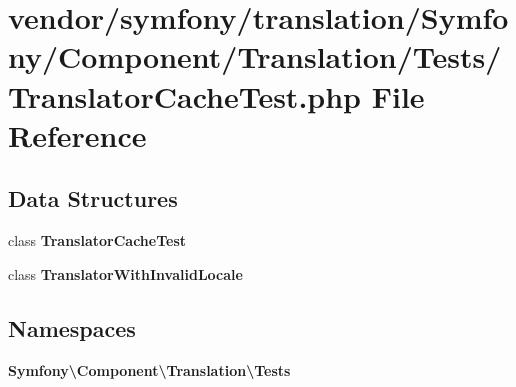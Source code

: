 \section{vendor/symfony/translation/\+Symfony/\+Component/\+Translation/\+Tests/\+Translator\+Cache\+Test.php File Reference}
\label{_translator_cache_test_8php}
\subsection*{Data Structures}
\begin{DoxyCompactItemize}
\item 
class {\bf Translator\+Cache\+Test}
\item 
class {\bf Translator\+With\+Invalid\+Locale}
\end{DoxyCompactItemize}
\subsection*{Namespaces}
\begin{DoxyCompactItemize}
\item 
 {\bf Symfony\textbackslash{}\+Component\textbackslash{}\+Translation\textbackslash{}\+Tests}
\end{DoxyCompactItemize}

